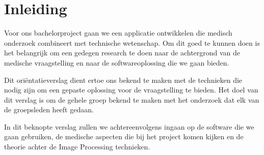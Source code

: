 \section{Inleiding}
\label{inleiding}
Voor ons bachelorproject gaan we een applicatie ontwikkelen die medisch onderzoek combineert met technische wetenschap. 
Om dit goed te kunnen doen is het belangrijk om een gedegen research te doen naar de achtergrond van de medische vraagstelling en naar de softwareoplossing die we gaan bieden.

Dit ori\"{e}ntatieverslag dient ertoe ons bekend te maken met de technieken die nodig zijn om een gepaste oplossing voor de vraagstelling te bieden. 
Het doel van dit verslag is om de gehele groep bekend te maken met het onderzoek dat elk van de groepsleden heeft gedaan.

In dit beknopte verslag zullen we achtereenvolgens ingaan op de software die we gaan gebruiken, de medische aspecten die bij het project komen kijken en de theorie achter de Image Processing technieken.
